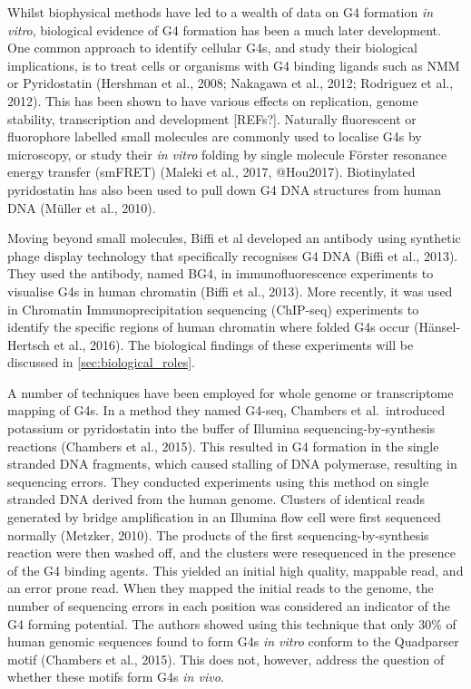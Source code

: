 \documentclass[12pt,a4paper,]{report}
\begin{document}
Whilst biophysical methods have led to a wealth of data on G4 formation
\emph{in vitro}, biological evidence of G4 formation has been a much
later development. One common approach to identify cellular G4s, and
study their biological implications, is to treat cells or organisms with
G4 binding ligands such as NMM or Pyridostatin (Hershman et al., 2008;
Nakagawa et al., 2012; Rodriguez et al., 2012). This has been shown to
have various effects on replication, genome stability, transcription and
development {[}REFs?{]}. Naturally fluorescent or fluorophore labelled
small molecules are commonly used to localise G4s by microscopy, or
study their \emph{in vitro} folding by single molecule Förster resonance
energy transfer (smFRET) (Maleki et al., 2017, @Hou2017). Biotinylated
pyridostatin has also been used to pull down G4 DNA structures from
human DNA (Müller et al., 2010).

Moving beyond small molecules, Biffi et al developed an antibody using
synthetic phage display technology that specifically recognises G4 DNA
(Biffi et al., 2013). They used the antibody, named BG4, in
immunofluorescence experiments to visualise G4s in human chromatin
(Biffi et al., 2013). More recently, it was used in Chromatin
Immunoprecipitation sequencing (ChIP-seq) experiments to identify the
specific regions of human chromatin where folded G4s occur
(Hänsel-Hertsch et al., 2016). The biological findings of these
experiments will be discussed in \autoref{sec:biological_roles}.

A number of techniques have been employed for whole genome or
transcriptome mapping of G4s. In a method they named G4-seq, Chambers et
al.~introduced potassium or pyridostatin into the buffer of Illumina
sequencing-by-synthesis reactions (Chambers et al., 2015). This resulted
in G4 formation in the single stranded DNA fragments, which caused
stalling of DNA polymerase, resulting in sequencing errors. They
conducted experiments using this method on single stranded DNA derived
from the human genome. Clusters of identical reads generated by bridge
amplification in an Illumina flow cell were first sequenced normally
(Metzker, 2010). The products of the first sequencing-by-synthesis
reaction were then washed off, and the clusters were resequenced in the
presence of the G4 binding agents. This yielded an initial high quality,
mappable read, and an error prone read. When they mapped the initial
reads to the genome, the number of sequencing errors in each position
was considered an indicator of the G4 forming potential. The authors
showed using this technique that only 30\% of human genomic sequences
found to form G4s \emph{in vitro} conform to the Quadparser motif
(Chambers et al., 2015). This does not, however, address the question of
whether these motifs form G4s \emph{in vivo}.
\end{document}
